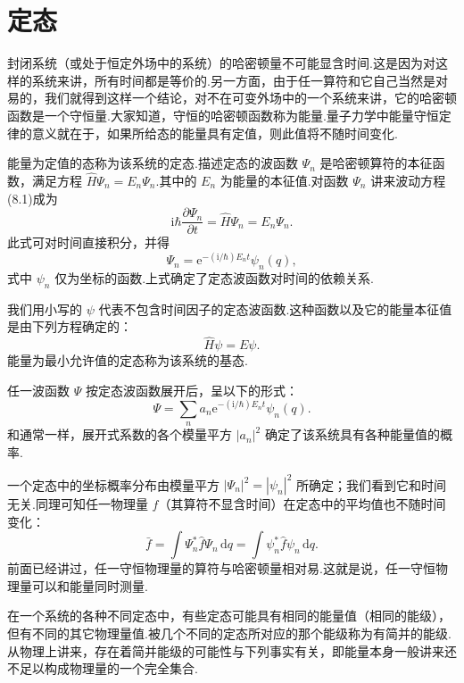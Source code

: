 \section{定态}

封闭系统（或处于恒定外场中的系统）的哈密顿量不可能显含时间.这是因为对这样的系统来讲，所有时间都是等价的.另一方面，由于任一算符和它自己当然是对易的，我们就得到这样一个结论，对不在可变外场中的一个系统来讲，它的哈密顿函数是一个守恒量.大家知道，守恒的哈密顿函数称为能量.量子力学中能量守恒定律的意义就在于，如果所给态的能量具有定值，则此值将不随时间变化.

能量为定值的态称为该系统的定态.描述定态的波函数 $\varPsi_n$ 是哈密顿算符的本征函数，满足方程 $\hat{H}\varPsi_n=E_n\varPsi_n$.其中的 $E_n$ 为能量的本征值.对函数 $\varPsi_n$ 讲来波动方程(8.1)成为
\begin{equation*}
  \mathrm{i}\hbar\frac{\partial\varPsi_n}{\partial t}
  =\hat{H}\varPsi_n=E_n\varPsi_n.
\end{equation*}
此式可对时间直接积分，并得
\begin{equation}
  \varPsi_n=\mathrm{e}^{-(\mathrm{i}/\hbar)E_nt}\psi_n(q),
\end{equation}
式中 $\psi_n$ 仅为坐标的函数.上式确定了定态波函数对时间的依赖关系.

我们用小写的 $\psi$ 代表不包含时间因子的定态波函数.这种函数以及它的能量本征值是由下列方程确定的：
\begin{equation}
  \hat{H}\psi=E\psi.
\end{equation}
能量为最小允许值的定态称为该系统的基态.

任一波函数 $\varPsi$ 按定态波函数展开后，呈以下的形式：
\begin{equation}
  \varPsi=\sum_n a_n\mathrm{e}^{-(\mathrm{i}/\hbar)E_nt}\psi_n(q).
\end{equation}
和通常一样，展开式系数的各个模量平方 $|a_n|^{2}$ 确定了该系统具有各种能量值的概率.

一个定态中的坐标概率分布由模量平方 $|\varPsi_n|^{2}=|\psi_n|^{2}$ 所确定；我们看到它和时间无关.同理可知任一物理量 $f$（其算符不显含时间）在定态中的平均值也不随时间变化：
\begin{equation*}
  \bar{f}=\int\varPsi_n^{*}\hat{f}\varPsi_n\,\mathrm{d}q
  =\int\psi_n^{*}\hat{f}\psi_n\,\mathrm{d}q.
\end{equation*}
前面已经讲过，任一守恒物理量的算符与哈密顿量相对易.这就是说，任一守恒物理量可以和能量同时测量.

在一个系统的各种不同定态中，有些定态可能具有相同的能量值（相同的能级），但有不同的其它物理量值.被几个不同的定态所对应的那个能级称为有简并的能级.从物理上讲来，存在着简并能级的可能性与下列事实有关，即能量本身一般讲来还不足以构成物理量的一个完全集合.

